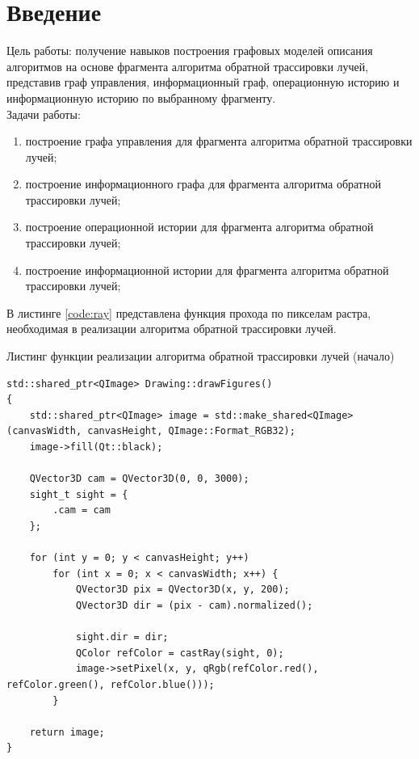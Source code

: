 \setcounter{page}{3}
\chapter*{Введение}
Цель работы: получение навыков построения графовых моделей описания алгоритмов на основе фрагмента алгоритма обратной трассировки лучей, представив граф управления, информационный граф, операционную историю и информационную историю по выбранному фрагменту.\\

Задачи работы:
\begin{enumerate}[label={\arabic*)}]
	\item построение графа управления для фрагмента алгоритма обратной трассировки лучей;
	\item построение информационного графа для фрагмента алгоритма обратной трассировки лучей;
	\item построение операционной истории для фрагмента алгоритма обратной трассировки лучей;
	\item построение информационной истории для фрагмента алгоритма обратной трассировки лучей;
\end{enumerate}

В листинге \ref{code:ray} представлена функция прохода по пикселам растра, необходимая в реализации алгоритма обратной трассировки лучей.

\begin{code}
\caption{Листинг функции реализации алгоритма обратной трассировки лучей (начало)}
\label{code:ray}
\begin{verbatim}
std::shared_ptr<QImage> Drawing::drawFigures()
{
    std::shared_ptr<QImage> image = std::make_shared<QImage>(canvasWidth, canvasHeight, QImage::Format_RGB32);
    image->fill(Qt::black);

    QVector3D cam = QVector3D(0, 0, 3000);
    sight_t sight = {
        .cam = cam
    };

    for (int y = 0; y < canvasHeight; y++)
        for (int x = 0; x < canvasWidth; x++) {
            QVector3D pix = QVector3D(x, y, 200);
            QVector3D dir = (pix - cam).normalized();

            sight.dir = dir;
            QColor refColor = castRay(sight, 0);
            image->setPixel(x, y, qRgb(refColor.red(), refColor.green(), refColor.blue()));
        }

    return image;
}

\end{verbatim}
\end{code}

